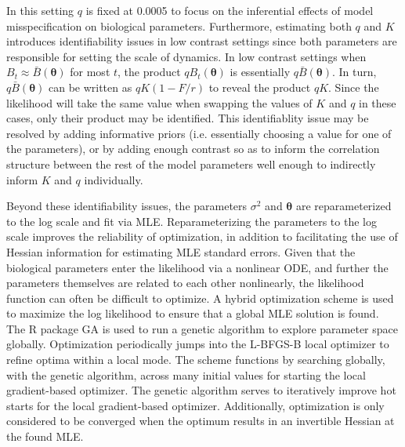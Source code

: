 In this setting $q$ is fixed at 0.0005 to focus on
the inferential effects of model misspecification on biological parameters. 
Furthermore, estimating both $q$ and $K$ introduces identifiability 
issues in low contrast settings since both parameters are responsible for 
setting the scale of dynamics. %
In low contrast settings when $B_t\approx\bar B(\bm{\theta})$ for most $t$, 
the product $qB_t(\bm{\theta})$ is essentially $q\bar B(\bm{\theta})$. In turn, %
$q\bar B(\bm{\theta})$ can be written as $qK(1-F/r)$ to reveal the product $qK$. 
Since the likelihood will take the same value when swapping the values of $K$ 
and $q$ in these cases, only their product may be identified. %
This identifiablity issue may be resolved by adding informative priors (i.e. 
essentially choosing a value for one of the parameters), or by adding enough 
contrast so as to inform the correlation structure between the rest of the model 
parameters well enough to indirectly inform $K$ and $q$ individually.

Beyond these identifiability issues, the parameters $\sigma^2$ and $\bm{\theta}$ 
are reparameterized to the log scale and fit via MLE.
Reparameterizing the parameters to the log scale improves the reliability
of optimization, in addition to facilitating the use of Hessian information
for estimating MLE standard errors.
%
Given that the biological parameters enter the likelihood via a nonlinear ODE,
and further the parameters themselves are related to each other nonlinearly,
the likelihood function can often be difficult to optimize. A hybrid optimization
scheme is used to maximize the log likelihood to ensure that a global MLE solution
is found. The R package GA \cite{scrucca_ga_2013, scrucca_extensions_2017} is
used to run a genetic algorithm to explore parameter space globally.
Optimization periodically jumps into the L-BFGS-B local optimizer to refine
optima within a local mode. The scheme functions by searching globally, with the genetic
algorithm, across many initial values for starting the local gradient-based optimizer.
The genetic algorithm serves to iteratively improve hot starts for the local
gradient-based optimizer. Additionally, optimization is only considered to be converged
when the optimum results in an invertible Hessian at the found MLE.

